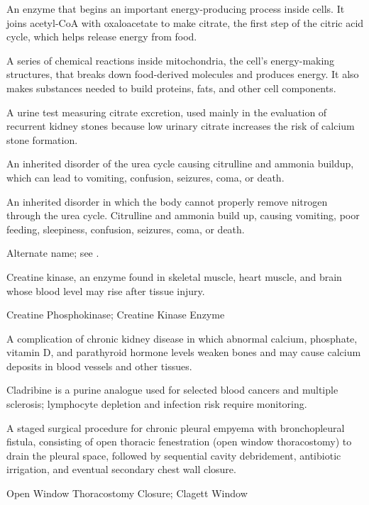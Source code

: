  An enzyme that begins an important energy-producing process inside cells. It joins acetyl-CoA with oxaloacetate to make citrate, the first step of the citric acid cycle, which helps release energy from food.

 A series of chemical reactions inside mitochondria, the cell's energy-making structures, that breaks down food-derived molecules and produces energy. It also makes substances needed to build proteins, fats, and other cell components.

 A urine test measuring citrate excretion, used mainly in the evaluation of recurrent kidney stones because low urinary citrate increases the risk of calcium stone formation.

 An inherited disorder of the urea cycle causing citrulline and ammonia buildup, which can lead to vomiting, confusion, seizures, coma, or death.

 An inherited disorder in which the body cannot properly remove nitrogen through the urea cycle. Citrulline and ammonia build up, causing vomiting, poor feeding, sleepiness, confusion, seizures, coma, or death.

 Alternate name; see .

 Creatine kinase, an enzyme found in skeletal muscle, heart muscle, and brain whose blood level may rise after tissue injury.

\synonyms
Creatine Phosphokinase; Creatine Kinase Enzyme

 A complication of chronic kidney disease in which abnormal calcium, phosphate, vitamin D, and parathyroid hormone levels weaken bones and may cause calcium deposits in blood vessels and other tissues.

 Cladribine is a purine analogue used for selected blood cancers and multiple sclerosis; lymphocyte depletion and infection risk require monitoring.

 A staged surgical procedure for chronic pleural empyema with bronchopleural fistula, consisting of open thoracic fenestration (open window thoracostomy) to drain the pleural space, followed by sequential cavity debridement, antibiotic irrigation, and eventual secondary chest wall closure.

\synonyms
Open Window Thoracostomy Closure; Clagett Window

